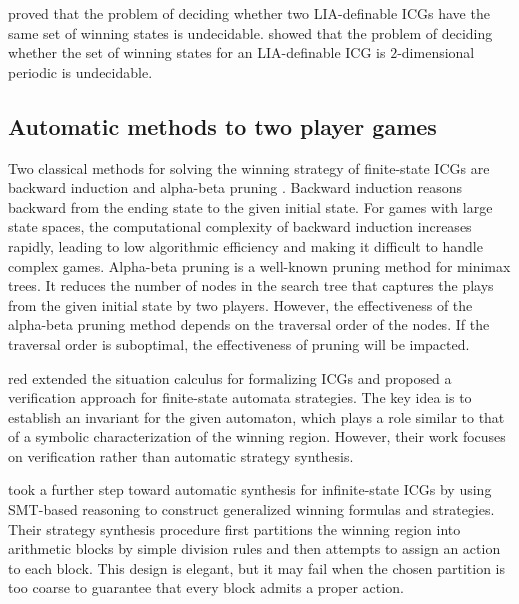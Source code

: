 \documentclass[review]{elsarticle}
\begin{document}
\citet{LarW2013} proved that the problem of deciding whether two LIA-definable ICGs have the same set of winning states is undecidable.	
\citet{Lar2013} showed that the problem of deciding whether the set of winning states for an LIA-definable ICG is $2$-dimensional periodic is undecidable.	


\subsection{Automatic methods to two player games}
Two classical methods for solving the winning strategy of finite-state ICGs are backward induction \cite{Wat2002} and alpha-beta pruning \cite{BelM2020,HeiPS2008}.
Backward induction reasons backward from the ending state to the given initial state. 
For games with large state spaces, the computational complexity of backward induction increases rapidly, leading to low algorithmic efficiency and making it difficult to handle complex games. 
Alpha-beta pruning is a well-known pruning method for minimax trees. 
It reduces the number of nodes in the search tree that captures the plays from the given initial state by two players. 
However, the effectiveness of the alpha-beta pruning method depends on the traversal order of the nodes. 
If the traversal order is suboptimal, the effectiveness of pruning will be impacted. 

\begin{color}{red}
\citet{LuoL2019} extended the situation calculus for formalizing ICGs and proposed a verification approach for finite-state automata strategies. 
The key idea is to establish an invariant for the given automaton, which plays a role similar to that of a symbolic characterization of the winning region. 
However, their work focuses on verification rather than automatic strategy synthesis.

\citet{WuFXLQCR2020} took a further step toward automatic synthesis for infinite-state ICGs by using SMT-based reasoning to construct generalized winning formulas and strategies. 
Their strategy synthesis procedure first partitions the winning region into arithmetic blocks by simple division rules and then attempts to assign an action to each block. 
This design is elegant, but it may fail when the chosen partition is too coarse to guarantee that every block admits a proper action.
\end{color}
\end{document}
